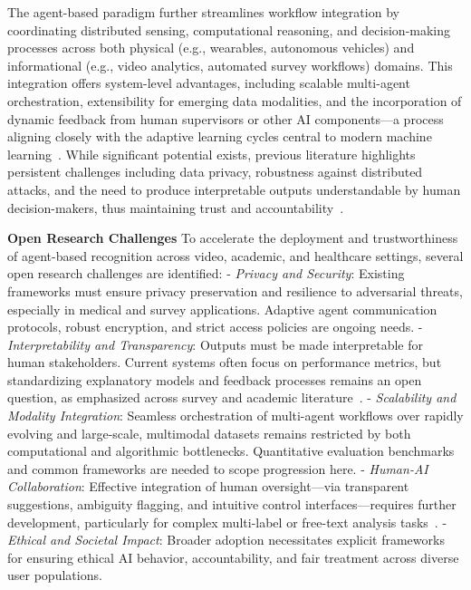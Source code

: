 \documentclass[sigconf]{acmart}
\begin{document}
The agent-based paradigm further streamlines workflow integration by coordinating distributed sensing, computational reasoning, and decision-making processes across both physical (e.g., wearables, autonomous vehicles) and informational (e.g., video analytics, automated survey workflows) domains. This integration offers system-level advantages, including scalable multi-agent orchestration, extensibility for emerging data modalities, and the incorporation of dynamic feedback from human supervisors or other AI components—a process aligning closely with the adaptive learning cycles central to modern machine learning~\cite{ref78,ref80,ref104}. While significant potential exists, previous literature highlights persistent challenges including data privacy, robustness against distributed attacks, and the need to produce interpretable outputs understandable by human decision-makers, thus maintaining trust and accountability~\cite{ref91,ref94,ref98,ref104}.

\textbf{Open Research Challenges}
To accelerate the deployment and trustworthiness of agent-based recognition across video, academic, and healthcare settings, several open research challenges are identified:
- \textit{Privacy and Security}: Existing frameworks must ensure privacy preservation and resilience to adversarial threats, especially in medical and survey applications. Adaptive agent communication protocols, robust encryption, and strict access policies are ongoing needs.
- \textit{Interpretability and Transparency}: Outputs must be made interpretable for human stakeholders. Current systems often focus on performance metrics, but standardizing explanatory models and feedback processes remains an open question, as emphasized across survey and academic literature~\cite{ref94,ref98,ref80}.
- \textit{Scalability and Modality Integration}: Seamless orchestration of multi-agent workflows over rapidly evolving and large-scale, multimodal datasets remains restricted by both computational and algorithmic bottlenecks. Quantitative evaluation benchmarks and common frameworks are needed to scope progression here.
- \textit{Human-AI Collaboration}: Effective integration of human oversight—via transparent suggestions, ambiguity flagging, and intuitive control interfaces—requires further development, particularly for complex multi-label or free-text analysis tasks~\cite{ref91}.
- \textit{Ethical and Societal Impact}: Broader adoption necessitates explicit frameworks for ensuring ethical AI behavior, accountability, and fair treatment across diverse user populations.
\end{document}
